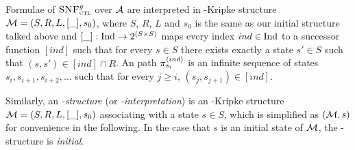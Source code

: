 \documentclass[letterpaper]{article} %
\begin{document}
Formulae of ${\textsc{SNF}_{\textsc{ctl}}^g}$ over ${\cal A}$ are interpreted in \Ind-Kripke structure ${\cal M}=(S,R,L, [\_], s_0)$, where $S$, $R$, $L$ and $s_0$ is the same as our initial structure talked above and $[\_]: \textrm{Ind} \rightarrow 2^{(S\times S)}$ maps every index $ind \in \textrm{Ind}$ to a successor function $[ind]$   such that for every $s\in S$ there exists exactly a state $s'\in S$ such that $(s,s')\in [ind] \cap R$.
An path $\pi_{s_i}^{{\langle{ind}\rangle}}$ is an infinite sequence of states $s_i, s_{i+1}, s_{i+2},\dots$ such that for every $j\geq i$, $(s_j, s_{j+1})\in [ind]$.

Similarly, an {\em \Ind-structure} (or {\em \Ind-interpretation}) is an \Ind-Kripke structure
${\cal M}=(S, R, L, [\_], s_0)$ associating
with a state $s\in S$, which is simplified as $({\cal M},s)$ for convenience in the following.
In the case that $s$ is an initial state of $\cal M$, the \Ind-structure is {\em initial}.
\end{document}
